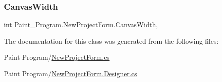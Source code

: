 \subsubsection{\texorpdfstring{Canvas\+Width}{CanvasWidth}}
{\footnotesize\ttfamily int Paint\+\_\+\+Program.\+New\+Project\+Form.\+Canvas\+Width\hspace{0.3cm}{\ttfamily [get]}, {}}



The documentation for this class was generated from the following files\+:\begin{DoxyCompactItemize}
\item 
Paint Program/\mbox{\hyperlink{_new_project_form_8cs}{New\+Project\+Form.\+cs}}\item 
Paint Program/\mbox{\hyperlink{_new_project_form_8_designer_8cs}{New\+Project\+Form.\+Designer.\+cs}}\end{DoxyCompactItemize}
